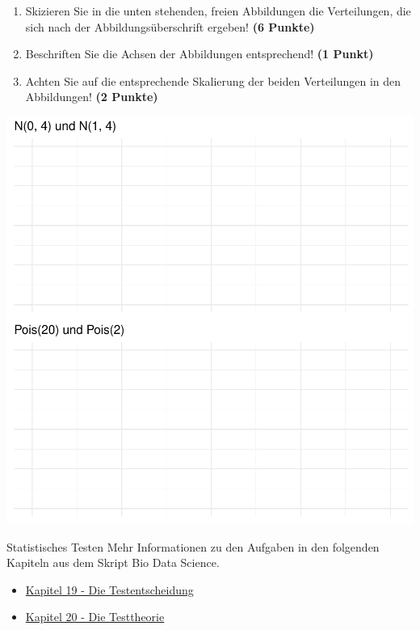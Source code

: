 \documentclass[a4paper, 9pt]{scrartcl}\usepackage[]{graphicx}\usepackage[]{xcolor}
\makeatletter
\def\maxwidth{ %
  \ifdim\Gin@nat@width>\linewidth
    \linewidth
  \else
    \Gin@nat@width
  \fi
}
\makeatother
\begin{document}
\begin{enumerate}
\item Skizieren Sie in die unten stehenden, freien Abbildungen die
  Verteilungen, die sich nach der Abbildungs{\"u}berschrift ergeben! \textbf{(6
    Punkte)}
\item Beschriften Sie die Achsen der Abbildungen entsprechend! \textbf{(1
    Punkt)}
\item Achten Sie auf die entsprechende Skalierung der beiden Verteilungen
  in den Abbildungen! \textbf{(2 Punkte)}
\end{enumerate}



{\centering \includegraphics[width=\maxwidth]{img/histogram-01-1} 

}



 
\clearpage
\begin{graybox}{Statistisches Testen}
Mehr Informationen zu den Aufgaben in den folgenden Kapiteln aus dem Skript Bio Data Science.
  \begin{itemize}
  \item \href{https://jkruppa.github.io/stat-tests-basic.html}{Kapitel 19 - Die Testentscheidung}
  \item \href{https://jkruppa.github.io/stat-tests-theorie.html}{Kapitel 20 - Die Testtheorie}
  \end{itemize}
\end{graybox}
\clearpage
\end{document}
